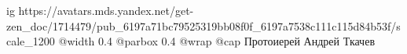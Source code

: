  
 
 
 
 

\ifcmt
  ig https://avatars.mds.yandex.net/get-zen_doc/1714479/pub_6197a71bc79525319bb08f0f_6197a7538c111c115d84b53f/scale_1200
  @width 0.4
  @parbox 0.4
  @wrap \parpic[r]
  @cap Протоиерей Андрей Ткачев
\fi
